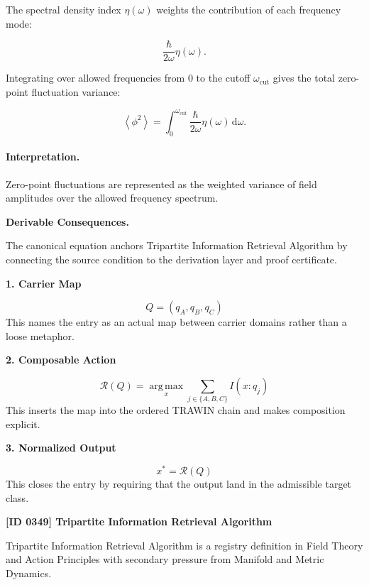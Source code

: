 The spectral density index $\eta(\omega)$ weights the contribution of each frequency mode:

\begin{equation}
\frac{\hbar}{2\omega}\eta(\omega).
\end{equation}

Integrating over allowed frequencies from $0$ to the cutoff $\omega_{\mathrm{cut}}$ gives the total zero-point fluctuation variance:

\begin{equation}
\boxed{
\left\langle\phi^2\right\rangle
=
\int_{0}^{\omega_{\mathrm{cut}}}
\frac{\hbar}{2\omega}
\eta(\omega)
\,\mathrm{d}\omega .
}
\end{equation}

\paragraph{Interpretation.}
Zero-point fluctuations are represented as the weighted variance of field amplitudes over the allowed frequency spectrum.

\par\vspace{0.35em}
\noindent\textbf{Derivable Consequences.}\quad
\begingroup
\footnotesize
\raggedright
The canonical equation anchors Tripartite Information Retrieval Algorithm by connecting the source condition to the derivation layer and proof certificate.
\par\endgroup

\noindent\textbf{1. Carrier Map}\par
\[
Q=(q_{A},q_{B},q_{C})
\]
\noindent This names the entry as an actual map between carrier domains rather than a loose metaphor.\par
\noindent\textbf{2. Composable Action}\par
\[
\mathcal{R}(Q)=\operatorname*{arg\,max}_{x}\sum_{j\in\{A,B,C\}} I(x:q_{j})
\]
\noindent This inserts the map into the ordered TRAWIN chain and makes composition explicit.\par
\noindent\textbf{3. Normalized Output}\par
\[
x^{\ast}=\mathcal{R}(Q)
\]
\noindent This closes the entry by requiring that the output land in the admissible target class.\par

\clearpage
\noindent\textbf{[ID 0349] Tripartite Information Retrieval Algorithm}\par
\vspace{0.35em}
\begingroup\small
{}
Tripartite Information Retrieval Algorithm is a registry definition in Field Theory and Action Principles with secondary pressure from Manifold and Metric Dynamics.

